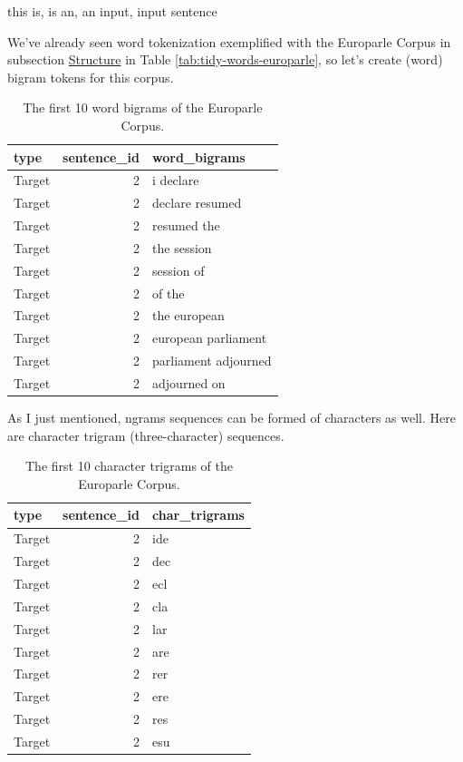 \documentclass[
]{article}
\begin{document}
this is, is an, an input, input sentence

We've already seen word tokenization exemplified with the Europarle Corpus in subsection \protect\hyperlink{structure}{Structure} in Table \ref{tab:tidy-words-europarle}, so let's create (word) bigram tokens for this corpus.

\begin{table}

\caption{\label{tab:recoding-tokenization-europarle-bigram-words}The first 10 word bigrams of the Europarle Corpus.}
\centering
\begin{tabular}[t]{lrl}
\toprule
type & sentence\_id & word\_bigrams\\
\midrule
Target & 2 & i declare\\
Target & 2 & declare resumed\\
Target & 2 & resumed the\\
Target & 2 & the session\\
Target & 2 & session of\\
\addlinespace
Target & 2 & of the\\
Target & 2 & the european\\
Target & 2 & european parliament\\
Target & 2 & parliament adjourned\\
Target & 2 & adjourned on\\
\bottomrule
\end{tabular}
\end{table}

As I just mentioned, ngrams sequences can be formed of characters as well. Here are character trigram (three-character) sequences.

\begin{table}

\caption{\label{tab:recoding-tokenization-europarle-trigram-chars}The first 10 character trigrams of the Europarle Corpus.}
\centering
\begin{tabular}[t]{lrl}
\toprule
type & sentence\_id & char\_trigrams\\
\midrule
Target & 2 & ide\\
Target & 2 & dec\\
Target & 2 & ecl\\
Target & 2 & cla\\
Target & 2 & lar\\
\addlinespace
Target & 2 & are\\
Target & 2 & rer\\
Target & 2 & ere\\
Target & 2 & res\\
Target & 2 & esu\\
\bottomrule
\end{tabular}
\end{table}
\end{document}
